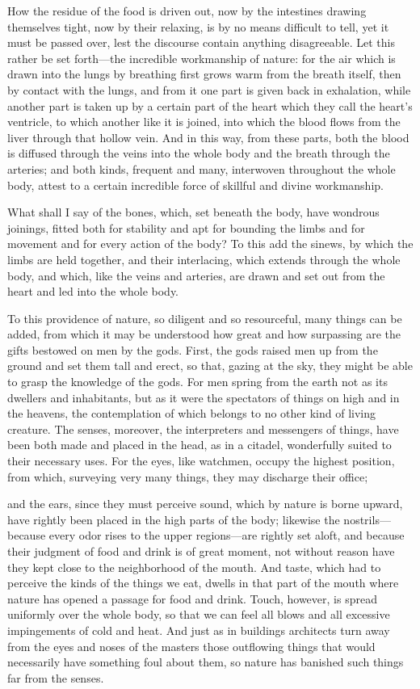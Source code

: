  How the residue of the food is driven out, now by the intestines drawing themselves tight, now by their relaxing, is by no means difficult to tell, yet it must be passed over, lest the discourse contain anything disagreeable. Let this rather be set forth—the incredible workmanship of nature: for the air which is drawn into the lungs by breathing first grows warm from the breath itself, then by contact with the lungs, and from it one part is given back in exhalation, while another part is taken up by a certain part of the heart which they call the heart's ventricle, to which another like it is joined, into which the blood flows from the liver through that hollow vein. And in this way, from these parts, both the blood is diffused through the veins into the whole body and the breath through the arteries; and both kinds, frequent and many, interwoven throughout the whole body, attest to a certain incredible force of skillful and divine workmanship.

 What shall I say of the bones, which, set beneath the body, have wondrous joinings, fitted both for stability and apt for bounding the limbs and for movement and for every action of the body? To this add the sinews, by which the limbs are held together, and their interlacing, which extends through the whole body, and which, like the veins and arteries, are drawn and set out from the heart and led into the whole body.

 To this providence of nature, so diligent and so resourceful, many things can be added, from which it may be understood how great and how surpassing are the gifts bestowed on men by the gods. First, the gods raised men up from the ground and set them tall and erect, so that, gazing at the sky, they might be able to grasp the knowledge of the gods. For men spring from the earth not as its dwellers and inhabitants, but as it were the spectators of things on high and in the heavens, the contemplation of which belongs to no other kind of living creature. The senses, moreover, the interpreters and messengers of things, have been both made and placed in the head, as in a citadel, wonderfully suited to their necessary uses. For the eyes, like watchmen, occupy the highest position, from which, surveying very many things, they may discharge their office;

 and the ears, since they must perceive sound, which by nature is borne upward, have rightly been placed in the high parts of the body; likewise the nostrils—because every odor rises to the upper regions—are rightly set aloft, and because their judgment of food and drink is of great moment, not without reason have they kept close to the neighborhood of the mouth. And taste, which had to perceive the kinds of the things we eat, dwells in that part of the mouth where nature has opened a passage for food and drink. Touch, however, is spread uniformly over the whole body, so that we can feel all blows and all excessive impingements of cold and heat. And just as in buildings architects turn away from the eyes and noses of the masters those outflowing things that would necessarily have something foul about them, so nature has banished such things far from the senses.

